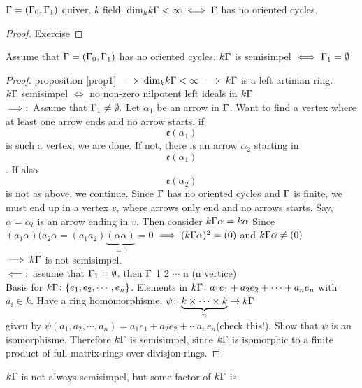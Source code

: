\begin{prop}\label{prop1}
	$\Gamma = (\Gamma_0,\Gamma_1)$ quiver, $k$ field. $\text{dim}_kk\Gamma < \infty \iff \Gamma$ has no oriented cycles.
\end{prop}

\begin{proof}
	Exercise
\end{proof}

\begin{prop}
	Assume that $\Gamma=(\Gamma_0,\Gamma_1)$ has no oriented cycles. $k\Gamma$ is semisimpel $\iff \Gamma_1 = \emptyset$
\end{prop}

\begin{proof}
	proposition \ref{prop1} $ \implies \text{dim}_kk\Gamma < \infty \implies k\Gamma$ is a left artinian ring. \\
	$k\Gamma$ semisimpel $\iff $ no non-zero nilpotent left ideals in $k\Gamma$\\
	$\implies\colon$ Assume that $\Gamma_1\neq\emptyset.$ Let $\alpha_1$ be an arrow in $\Gamma$. Want to find a vertex where at least one arrow ends and no arrow starts. if \[\mathfrak{e}(\alpha_1)\] is such a vertex, we are done. If not, there is an arrow $\alpha_2$ starting in \[\mathfrak{e}(\alpha_1) \]. If also\[\mathfrak{e}(\alpha_2)\] is not as above, we continue. Since $\Gamma$ has no oriented cycles and $\Gamma$ is finite, we must end up in a vertex $ v$, where arrows only end and no arrows starts. Say, $\alpha = \alpha_t$ is an arrow ending in $v$. Then consider $k\Gamma\alpha = k\alpha$ Since $(a_1\alpha)(a_2\alpha = (a_1a_2)\underbrace{(\alpha\alpha)}_{=0} = 0$ $\implies (k\Gamma\alpha)^2=(0)$ and $k\Gamma\alpha \neq (0)$\\
	$\implies k\Gamma$ is not semisimpel.\\\newline
	$\impliedby\colon$ assume that $\Gamma_1 = \emptyset$. then $\Gamma$ 1 2 $\cdots$ n (n vertice)\\
	Basis for $k\Gamma\colon \{e_1, e_2, \cdots, e_n\}$. Elements in $k\Gamma\colon a_1e_1 + a_2e_2 + \cdots + a_ne_n$ with $a_i \in k$. Have a ring homomorphisme. $ \psi\colon \underbrace{k \times \cdots \times k}_{n}  \rightarrow k\Gamma$\\
	given by $\psi(a_1,a_2,\cdots,a_n)=a_1e_1 + a_2e_2+ \cdots a_ne_n$(check this!). Show that $\psi$ is an isomorphisme. Therefore $k\Gamma$ is semisimpel, since $k\Gamma$ is isomorphic to a finite product of full matrix rings over divisjon rings.
\end{proof}

$k\Gamma$ is not always semisimpel, but some factor of $k\Gamma$ is.\newline

